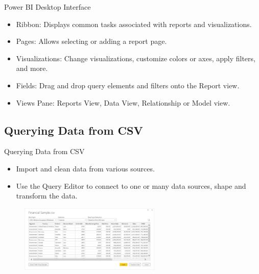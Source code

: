 \documentclass[aspectratio=169, hideothersubsections]{beamer}
\begin{document}
\begin{frame}{Power BI Desktop Interface}
  \begin{itemize}
    \item Ribbon: Displays common tasks associated with reports and visualizations.
    \item Pages: Allows selecting or adding a report page.
    \item Visualizations: Change visualizations, customize colors or axes, apply filters, and more.
    \item Fields: Drag and drop query elements and filters onto the Report view.
    \item Views Pane: Reports View, Data View, Relationship or Model view.
  \end{itemize}
\end{frame}

\subsection{Querying Data from CSV}
\begin{frame}{Querying Data from CSV}
  \begin{itemize}
    \item Import and clean data from various sources.
    \item Use the Query Editor to connect to one or many data sources, shape and transform the data.
  \end{itemize}
 \begin{figure}
  \centering
  \includegraphics[width=0.6\textwidth]{pb3.png}
  \label{fig:example}
\end{figure}
\end{frame}
\end{document}

